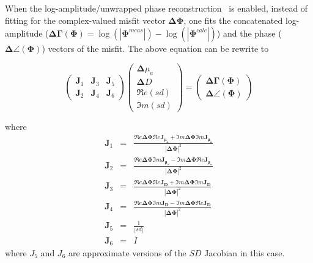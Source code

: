 \documentclass[12pt]{book}               %
\begin{document}
When the log-amplitude/unwrapped phase reconstruction~\cite{FangThesis, Fang2006a, Meaney2007b} is enabled, instead of fitting for 
the complex-valued misfit vector $\boldsymbol{\Delta\Phi}$, one fits the concatenated log-amplitude ($\boldsymbol{\Delta\Gamma(\Phi)}=\log(|\boldsymbol{\Phi}^{meas}|)-\log(|\boldsymbol{\Phi}^{calc}|)$) and the phase ($\boldsymbol{\Delta\angle(\Phi)}$)
vectors of the misfit. The above equation can be rewrite to

\begin{equation}\label{eq:logphase}
\left(
\begin{array}{lll}
\mathbf{J}_1 & \mathbf{J}_3 & \mathbf{J}_5\\
\mathbf{J}_2 & \mathbf{J}_4 & \mathbf{J}_6
\end{array}\right)
\left(
\begin{array}{l}
\boldsymbol{\Delta}{\mu_a}\\
\boldsymbol{\Delta}{D}\\
\Re e({sd})\\
\Im m({sd})
\end{array}
\right)=\left(
\begin{array}{l}
{\boldsymbol{\Delta\Gamma(\Phi)}}\\
{\boldsymbol{\Delta\angle(\Phi)}}
\end{array}\right)
\end{equation}

where
\begin{eqnarray}\nonumber
\mathbf{J}_1&=&\frac{\Re e{\boldsymbol{\Delta\Phi}}\Re e{\boldsymbol{\mathbf{J}_{\mu_a}}}
+\Im m{\boldsymbol{\Delta\Phi}}\Im m{\boldsymbol{\mathbf{J}_{\mu_a}}} }{|\boldsymbol{\Delta\Phi}|^2} \\\nonumber
\mathbf{J}_2&=&\frac{\Re e{\boldsymbol{\Delta\Phi}}\Im m{\boldsymbol{\mathbf{J}_{\mu_a}}}
-\Im m{\boldsymbol{\Delta\Phi}}\Re e{\boldsymbol{\mathbf{J}_{\mu_a}}} }{|\boldsymbol{\Delta\Phi}|^2} \\
\mathbf{J}_3&=&\frac{\Re e{\boldsymbol{\Delta\Phi}}\Re e{\boldsymbol{\mathbf{J}_{D}}}
+\Im m{\boldsymbol{\Delta\Phi}}\Im m{\boldsymbol{\mathbf{J}_{D}}} }{|\boldsymbol{\Delta\Phi}|^2} \\\nonumber
\mathbf{J}_4&=&\frac{\Re e{\boldsymbol{\Delta\Phi}}\Im m{\boldsymbol{\mathbf{J}_{D}}}
-\Im m{\boldsymbol{\Delta\Phi}}\Re e{\boldsymbol{\mathbf{J}_{D}}} }{|\boldsymbol{\Delta\Phi}|^2} \\\nonumber
\mathbf{J}_5&=& \frac{1}{|sd|} \\\nonumber
\mathbf{J}_6&=& I \nonumber
\end{eqnarray}
where $J_5$ and $J_6$ are approximate versions of the $SD$ Jacobian in this case.
\end{document}
